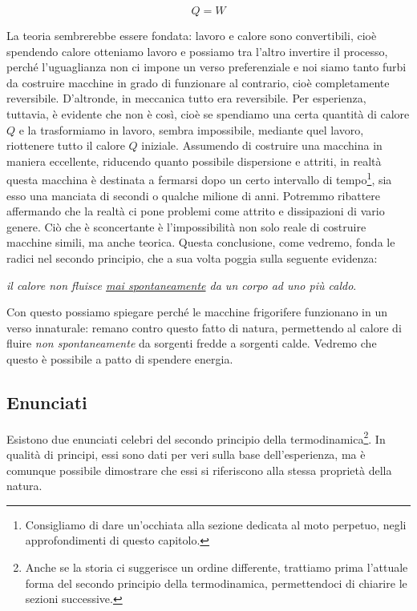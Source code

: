 \[ Q = W \]

\noindent La teoria sembrerebbe essere fondata: lavoro e calore sono
convertibili, cioè spendendo calore otteniamo lavoro e possiamo tra l'altro
invertire il processo, perché l'uguaglianza non ci impone un
verso preferenziale e noi siamo tanto furbi da costruire macchine
in grado di funzionare al contrario, cioè completamente reversibile.
D'altronde, in meccanica tutto era reversibile. Per esperienza, tuttavia, è evidente che non
è così, cioè se spendiamo una certa quantità di calore $Q$ e
la trasformiamo in lavoro, sembra impossibile, mediante quel lavoro,
riottenere tutto il calore $Q$ iniziale.
Assumendo di costruire una macchina in maniera
eccellente, riducendo quanto possibile dispersione e attriti,
in realtà questa macchina è destinata a fermarsi dopo un certo
intervallo di tempo\footnote{Consigliamo di dare un'occhiata alla
sezione dedicata al moto perpetuo, negli approfondimenti di questo
capitolo.}, sia esso una manciata di secondi o qualche milione di
anni.
Potremmo ribattere affermando che la realtà ci pone problemi come
attrito e dissipazioni di vario genere. Ciò che è sconcertante è
l'impossibilità non solo reale di costruire macchine simili,
ma anche teorica. Questa conclusione, come vedremo, fonda
le radici nel secondo principio, che a sua volta poggia sulla
seguente evidenza:

\begin{center}
    \textit{il calore non fluisce \underline{\emph{mai spontaneamente}} da un corpo ad uno più caldo}.
\end{center}

\noindent Con questo possiamo spiegare perché le macchine frigorifere
funzionano in un verso innaturale: remano contro questo fatto di natura,
permettendo al calore di fluire \emph{non spontaneamente} da sorgenti
fredde a sorgenti calde. Vedremo che questo è possibile a patto
di spendere energia.

\subsection{Enunciati}
Esistono due enunciati celebri del secondo principio della termodinamica\footnote{Anche se la storia ci suggerisce
un ordine differente, trattiamo prima l'attuale forma
del secondo principio della termodinamica, permettendoci di chiarire
le sezioni successive.}.
In qualità di principi, essi sono dati per veri sulla base dell'esperienza,
ma è comunque possibile dimostrare che essi si riferiscono alla
stessa proprietà della natura.

